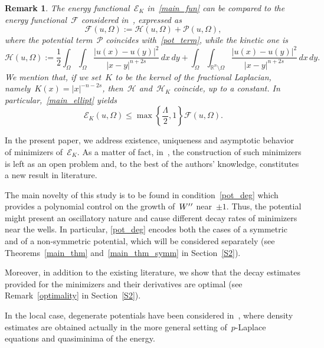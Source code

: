 \documentclass[10pt,a4paper]{amsart}
\newtheorem{rem}[theorem]{Remark}
\numberwithin{equation}{section}
\newcommand{\R}{\mathbb{R}}
\newcommand{\Ec}{\mathcal{E}_K}
\newcommand{\Hc}{\mathcal{H}_K}
\newcommand{\Pc}{\mathcal{P}}
\begin{document}
\begin{rem}
{\rm
The energy functional~$\Ec$ in~\eqref{main_fun} can be compared to the energy functional~$\mathcal{F}$ considered in~\cite{PSV13}, expressed as
\begin{equation}\label{psv_en}
\mathcal{F}(u,\Omega) := \mathscr{H}(u, \Omega) + \Pc(u, \Omega),
\end{equation}
where the potential term~$ \Pc$ coincides with~\eqref{pot_term}, while the kinetic one is
\begin{equation*}
\mathcal{H}(u, \Omega):= \frac{1}{2} \int_{\Omega} \int_{\Omega} \frac{| u(x)-u(y) |^2}{|x-y|^{n+2s}} \, dx \, dy + \int_{\Omega}  \int_{\R^n\setminus\Omega}\frac{| u(x)-u(y) |^2}{|x-y|^{n+2s}} \, dx \, dy.
\end{equation*}
We mention that, if we set~$K$ to be the kernel of the fractional Laplacian, namely~$K(x)=|x|^{-n-2s}$, then~$\mathcal{H}$ and~$\Hc$ coincide, up to a constant. In particular,~\eqref{main_ellipt} yields
\begin{equation}\label{en_relation}
\Ec(u,\Omega)\leq \max \left\{ \frac{\Lambda}{2},1\right\} \mathcal{F}(u,\Omega).
\end{equation}
}
\end{rem}
   
In the present paper, we address existence, uniqueness and asymptotic behavior of minimizers of~$\Ec$. As a matter of fact, in~\cite[Remark 2.4]{CP16}, the construction of such minimizers is left as an open problem and, to the best of the authors\rq{} knowledge, constitutes a new result in literature. 

The main novelty of this study is to be found in condition~\eqref{pot_deg} which provides a polynomial control on the growth of~$W\rq{}\rq{}$ near~$\pm1$. Thus, the potential might present an oscillatory nature
and cause different decay rates of minimizers near the wells.
In particular, \eqref{pot_deg} encodes both the cases of a symmetric and of a non-symmetric potential, which will be considered separately (see Theorems~\ref{main_thm} and~\ref{main_thm_symm} in Section~\ref{S2}).

Moreover, in addition to the existing literature, we show that the decay estimates provided for the minimizers and their derivatives are optimal (see Remark~\ref{optimality} in Section~\ref{S2}).

In the local case, degenerate potentials have been
considered in~\cite{farina}, where density estimates are obtained
actually in the more general setting of~$p$-Laplace equations and quasiminima of the energy.
\end{document}
